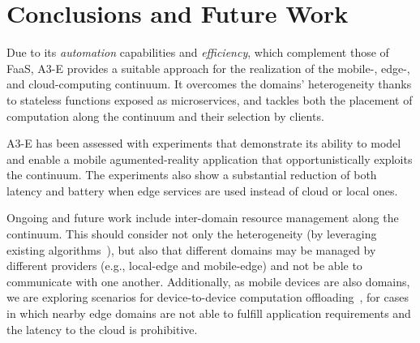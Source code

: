 \section{Conclusions and Future Work}\label{sec:conclusions}

Due to its \textit{automation} capabilities and \textit{efficiency}, which complement those of FaaS, A3-E provides a suitable approach for the realization of the mobile-, edge-, and cloud-computing continuum. It overcomes the domains' heterogeneity thanks to stateless functions exposed as microservices, and tackles both the placement of computation along the continuum and their selection by clients.

A3-E has been assessed with experiments that demonstrate its ability to model and enable a mobile agumented-reality application that opportunistically exploits the continuum. The experiments also show a substantial reduction of both latency and battery when edge services are used instead of cloud or local ones. 

Ongoing and future work include inter-domain resource management along the continuum. This should consider not only the heterogeneity (by leveraging existing algorithms~\cite{Tarneberg2017}), but also that different domains may be managed by different providers (e.g., local-edge and mobile-edge) and not be able to communicate with one another. Additionally, as mobile devices are also domains, we are exploring scenarios for device-to-device computation offloading~\cite{Mendonca2016A3droid}, for cases in which nearby edge domains are not able to fulfill application requirements and the latency to the cloud is prohibitive.
